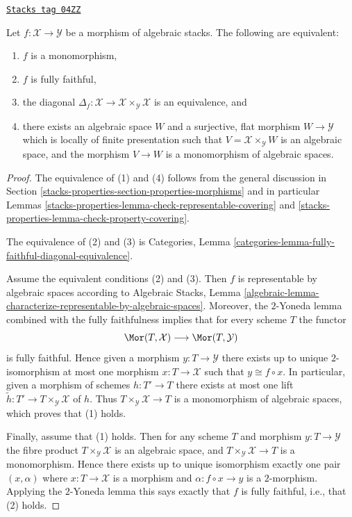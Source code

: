 \begin{lemma}[Monomorphism]
\label{stacks-properties-lemma-monomorphism}
\href{https://stacks.math.columbia.edu/tag/04ZZ}{\texttt{Stacks tag 04ZZ}}

Let $f : \mathcal{X} \to \mathcal{Y}$ be a morphism of algebraic stacks.
The following are equivalent:
\begin{enumerate}
\item $f$ is a monomorphism,
\item $f$ is fully faithful,
\item the diagonal
$\Delta_f : \mathcal{X} \to \mathcal{X} \times_\mathcal{Y} \mathcal{X}$
is an equivalence, and
\item there exists an algebraic space $W$ and a surjective, flat morphism
$W \to \mathcal{Y}$ which is locally of finite presentation such that
$V = \mathcal{X} \times_\mathcal{Y} W$ is an algebraic space, and the
morphism $V \to W$ is a monomorphism of algebraic spaces.
\end{enumerate}
\end{lemma}

\begin{proof}
The equivalence of (1) and (4) follows from the general discussion in
Section \ref{stacks-properties-section-properties-morphisms}
and in particular
Lemmas \ref{stacks-properties-lemma-check-representable-covering} and
\ref{stacks-properties-lemma-check-property-covering}.

\medskip\noindent
The equivalence of (2) and (3) is
Categories, Lemma \ref{categories-lemma-fully-faithful-diagonal-equivalence}.

\medskip\noindent
Assume the equivalent conditions (2) and (3). Then $f$ is representable
by algebraic spaces according to
Algebraic Stacks,
Lemma \ref{algebraic-lemma-characterize-representable-by-algebraic-spaces}.
Moreover, the $2$-Yoneda lemma combined with the fully faithfulness
implies that for every scheme $T$ the functor
$$
\Mor(T, \mathcal{X})
\longrightarrow
\Mor(T, \mathcal{Y})
$$
is fully faithful. Hence given a morphism $y : T \to \mathcal{Y}$ there exists
up to unique $2$-isomorphism at most one morphism $x : T \to \mathcal{X}$
such that $y \cong f \circ x$. In particular, given a morphism of schemes
$h : T' \to T$ there exists at most one lift
$\tilde h : T' \to T \times_\mathcal{Y} \mathcal{X}$ of $h$.
Thus $T \times_\mathcal{Y} \mathcal{X} \to T$ is a monomorphism of
algebraic spaces, which proves that (1) holds.

\medskip\noindent
Finally, assume that (1) holds. Then for any scheme $T$ and morphism
$y : T \to \mathcal{Y}$ the fibre product $T \times_\mathcal{Y} \mathcal{X}$
is an algebraic space, and $T \times_\mathcal{Y} \mathcal{X} \to T$
is a monomorphism. Hence there exists up to unique isomorphism
exactly one pair $(x, \alpha)$ where $x : T \to \mathcal{X}$ is a morphism
and $\alpha : f \circ x \to y$ is a $2$-morphism. Applying
the $2$-Yoneda lemma this says exactly that $f$ is fully faithful, i.e.,
that (2) holds.
\end{proof}

